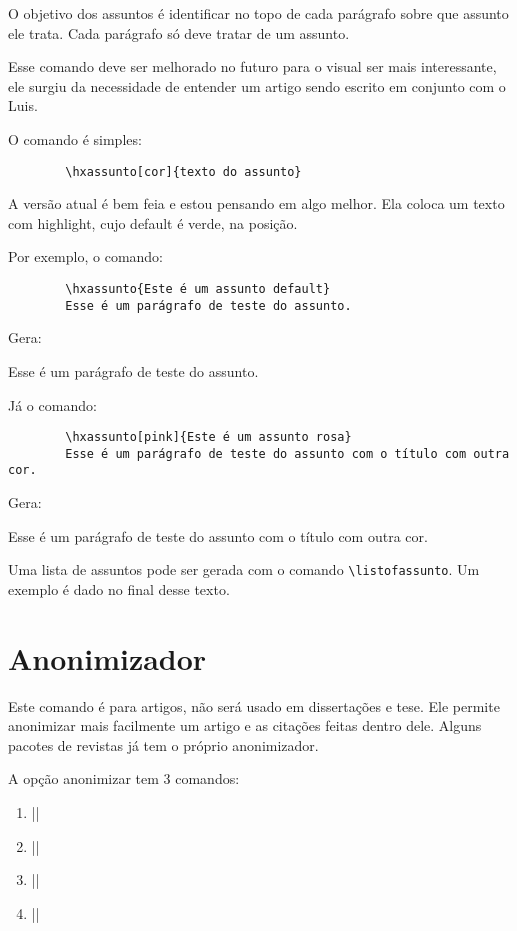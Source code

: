 \documentclass{article}
\begin{document}
    O objetivo dos assuntos é identificar no topo de cada parágrafo sobre que assunto ele trata. Cada parágrafo só deve tratar de um assunto.
    
    Esse comando deve ser melhorado no futuro para o visual ser mais interessante, ele surgiu da necessidade de entender um artigo sendo escrito em conjunto com o Luis.
    
    O comando é simples:
    
    \begin{verbatim}
        \hxassunto[cor]{texto do assunto}
    \end{verbatim}
    
    A versão atual é bem feia e estou pensando em algo melhor. Ela coloca um texto com highlight, cujo default é verde, na posição.
    
    Por exemplo, o comando:
    \begin{verbatim}
        \hxassunto{Este é um assunto default}
        Esse é um parágrafo de teste do assunto.
    \end{verbatim}
    
    Gera:
    
    Esse é um parágrafo de teste do assunto.
    
    
    Já o comando:
    \begin{verbatim}
        \hxassunto[pink]{Este é um assunto rosa}
        Esse é um parágrafo de teste do assunto com o título com outra cor.
    \end{verbatim}
    
    
    Gera:
    
    Esse é um parágrafo de teste do assunto com o título com outra cor.
    
    
    Uma lista de assuntos pode ser gerada com o comando
    \verb!\listofassunto!. Um exemplo é dado no final desse texto.
    
    \section{Anonimizador}
    
    Este comando é para artigos, não será usado em dissertações e tese. Ele permite anonimizar mais facilmente um artigo e as citações feitas dentro dele. Alguns pacotes de revistas já tem o próprio anonimizador.
    
    A opção anonimizar tem 3 comandos:
    \begin{enumerate}
        \item ||
        \item ||
        \item ||
        \item ||
    \end{enumerate}
    
\end{document}
